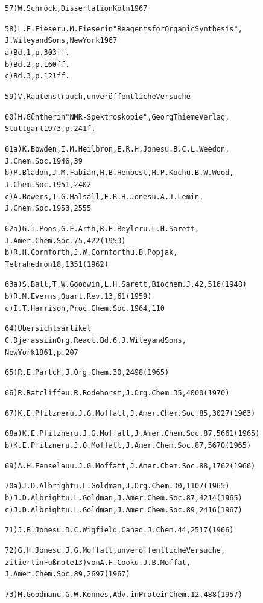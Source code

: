 \documentclass[a4paper,11pt]{article}
\begin{document}
\begin{alltt}
57)   W.Schröck, Dissertation Köln 1967
\newpage
{}


58)   L.F.Fieser u. M.Fieser in "Reagents for Organic Synthesis",
      J.Wiley and Sons, New York 1967
   a) Bd. 1, p. 303 ff.
   b) Bd. 2, p. 160 ff.
   c) Bd. 3, p. 121 ff.

59)   V.Rautenstrauch, unveröffentliche Versuche

60)   H.Günther in "NMR-Spektroskopie", Georg Thieme Verlag,
      Stuttgart 1973, p. 241 f.

61 a) K.Bowden, I.M.Heilbron, E.R.H.Jones u. B.C.L.Weedon,
      J.Chem.Soc. 1946, 39
   b) P.Bladon, J.M.Fabian, H.B.Henbest, H.P.Koch u. B.W.Wood,
      J.Chem.Soc. 1951, 2402
   c) A.Bowers, T.G.Halsall, E.R.H.Jones u. A.J.Lemin,
      J.Chem.Soc. 1953, 2555

62 a) G.I.Poos, G.E.Arth, R.E.Beyler u. L.H.Sarett,
      J.Amer.Chem.Soc. 75, 422 (1953)
   b) R.H.Cornforth, J.W.Cornforth u. B.Popjak,
      Tetrahedron 18, 1351 (1962)

63 a) S.Ball, T.W.Goodwin, L.H.Sarett, Biochem.J. 42, 516 (1948)
   b) R.M.Everns, Quart.Rev. 13, 61 (1959)
   c) I.T.Harrison, Proc.Chem.Soc. 1964, 110

64)   Übersichtsartikel
      C.Djerassi in Org.React. Bd. 6, J.Wiley and Sons,
      New York 1961, p. 207

65)   R.E.Partch, J.Org.Chem. 30, 2498 (1965)

66)   R.Ratcliffe u. R.Rodehorst, J.Org.Chem. 35, 4000 (1970)

67)   K.E.Pfitzner u. J.G.Moffatt, J.Amer.Chem.Soc. 85, 3027 (1963)

68 a) K.E.Pfitzner u. J.G.Moffatt, J.Amer.Chem.Soc. 87, 5661 (1965)
   b) K.E.Pfitzner u. J.G.Moffatt, J.Amer.Chem.Soc. 87, 5670 (1965)

69)   A.H.Fenselau u. J.G.Moffatt, J.Amer.Chem.Soc. 88, 1762 (1966)

70 a) J.D.Albright u. L.Goldman, J.Org.Chem. 30, 1107 (1965)
   b) J.D.Albright u. L.Goldman, J.Amer.Chem.Soc. 87, 4214 (1965)
   c) J.D.Albright u. L.Goldman, J.Amer.Chem.Soc. 89, 2416 (1967)

71)   J.B.Jones u. D.C.Wigfield, Canad.J.Chem. 44, 2517 (1966)
\newpage
{}


72)   G.H.Jones u. J.G.Moffatt, unveröffentliche Versuche,
      zitiert in Fußnote 13) von A.F.Cook u. J.B.Moffat,
      J.Amer.Chem.Soc. 89, 2697 (1967)

73)   M.Goodman u. G.W.Kennes, Adv. in Protein Chem. 12, 488 (1957)


\end{alltt}
\end{document}
